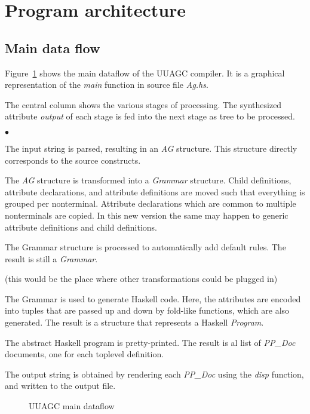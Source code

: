 \documentclass[twoside]{article}
\newenvironment{itize}{\begin{list}{$\bullet$}{\parsep=0pt\parskip=0pt\topsep=0pt\itemsep=0pt}}{\end{list}}
\newcommand{\simplepicture}[2]{\centerline{\mbox{\texttt{[image: figs/\#2]}}}}
\begin{document}
\newpage
\section{Program architecture}

\subsection{Main data flow}

Figure~\ref{fig.dataflow} shows the main dataflow of the UUAGC compiler.
It is a graphical representation of the {\em main} function in source file {\em Ag.hs}.

The central column shows the various stages of processing.
The synthesized attribute {\em output} of each stage is fed
into the next stage as tree to be processed.
\begin{itize}
\item The input string is parsed, resulting in an {\em AG} structure.
      This structure directly corresponds to the source constructs.
\item The {\em AG} structure is transformed into a {\em Grammar} structure.
      Child definitions, attribute declarations, and attribute definitions
      are moved such that everything is grouped per nonterminal.
      Attribute declarations which are common to multiple nonterminals are copied.
      In this new version the same may happen to generic attribute definitions and child definitions.
\item The Grammar structure is processed to automatically add default rules.
      The result is still a {\em Grammar}.
\item (this would be the place where other transformations could be plugged in)
\item The Grammar is used to generate Haskell code.
      Here, the attributes are encoded into tuples that are passed up and down 
      by fold-like functions, which are also generated.
      The result is a structure that represents a Haskell {\em Program}.
\item The abstract Haskell program is pretty-printed.
      The result is al list of {\em PP\_Doc} documents, one for each toplevel definition.
\item The output string is obtained by rendering each {\em PP\_Doc} using the {\em disp} function,
      and written to the output file.
\end{itize}
\begin{figure}[htb]
\raisebox{0mm}{\simplepicture{0.6}{uuagc-dataflow}}
\caption{UUAGC main dataflow}
\label{fig.dataflow}
\end{figure}
\end{document}
